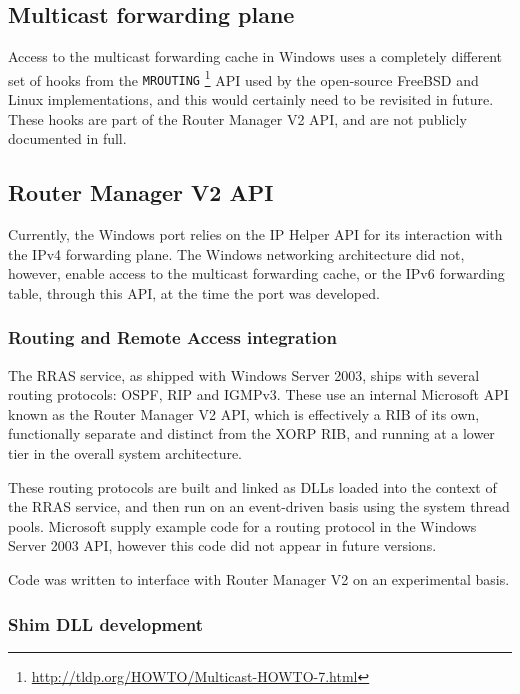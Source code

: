 \documentclass[11pt]{article}
\begin{document}
{{%
\subsection{Multicast forwarding plane}

Access to the multicast forwarding cache in Windows uses a completely
different set of hooks from the {\tt MROUTING}
\footnote{\url{http://tldp.org/HOWTO/Multicast-HOWTO-7.html}}
API used by the open-source
FreeBSD and Linux implementations, and this would certainly need to be
revisited in future. These hooks are part of the Router Manager V2 API,
and are not publicly documented in full.

\subsection{Router Manager V2 API}

Currently, the Windows port relies on the IP Helper API for its interaction
with the IPv4 forwarding plane. The Windows networking architecture did
not, however, enable access to the multicast forwarding cache, or the IPv6
forwarding table, through this API, at the time the port was developed.

\subsubsection{Routing and Remote Access integration}
 
The RRAS service, as shipped with Windows Server 2003, ships with several
routing protocols: OSPF, RIP and IGMPv3. These use an internal Microsoft
API known as the Router Manager V2 API, which is effectively a RIB of its own,
functionally separate and distinct from the XORP RIB, and running at a lower
tier in the overall system architecture.

These routing protocols are built and linked as DLLs
loaded into the context of the RRAS service, and then run on an event-driven
basis using the system thread pools. Microsoft supply example code for a routing
protocol in the Windows Server 2003 API, however this code did not appear
in future versions.

Code was written to interface with Router Manager V2 on an experimental basis.

\subsubsection{Shim DLL development}

}}
\end{document}
